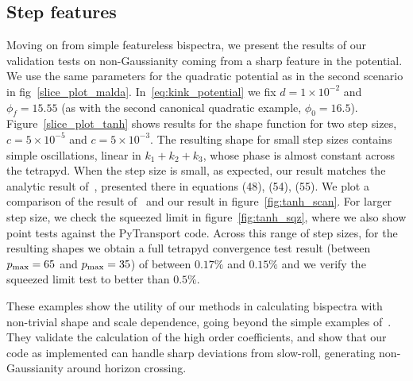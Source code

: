 \subsection{Step features}
Moving on from simple featureless bispectra, we present the results of
our validation tests on non-Gaussianity coming from a sharp feature in the potential.
We use the same parameters for the quadratic potential as in the
second scenario in fig~\ref{slice_plot_malda}.
In~\eqref{eq:kink_potential}
we fix $d=1\times10^{-2}$ and $\phi_{f}=15.55$
(as with the second canonical quadratic example, $\phi_0=16.5$).
Figure~\ref{slice_plot_tanh}
shows results for the shape function for two step sizes,
$c=5\times10^{-5}$ and $c=5\times10^{-3}$.
The resulting shape for small step sizes contains simple oscillations,
linear in $k_1+k_2+k_3$,
whose phase is almost constant across the tetrapyd.
When the step size is small, as expected,
our result matches the analytic result of~\cite{adshead},
presented there in equations (48), (54), (55).
We plot a comparison of the result of~\cite{adshead} and our result
in figure~\ref{fig:tanh_scan}.
For larger step size, we check the squeezed limit in figure~\ref{fig:tanh_sqz},
where we also show point tests against the PyTransport code.
Across this range of step sizes, for the resulting shapes we obtain
a full tetrapyd convergence test result
(between $p_\text{max}=65$ and $p_\text{max}=35$)
of between $0.17\%$ and $0.15\%$ and
we verify the squeezed limit test to better than $0.5\%$.

These examples show the utility of our methods in
calculating bispectra with non-trivial shape and scale dependence,
going beyond the simple examples of~\cite{Funakoshi}.
They validate the calculation of the high order coefficients,
and show that our code as implemented can handle sharp deviations from slow-roll,
generating non-Gaussianity around horizon crossing.


